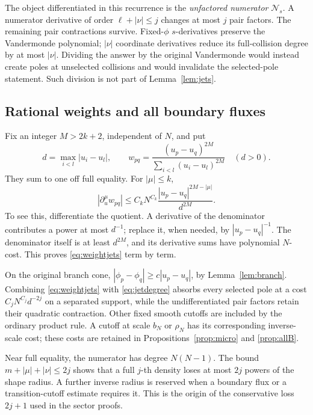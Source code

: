 \documentclass[11pt]{article}
\numberwithin{equation}{section}
\theoremstyle{definition}
\begin{document}
The object differentiated in this recurrence is the
\emph{unfactored numerator} \(\mathscr N_s\).
A numerator derivative of order \(\ell+|\nu|\le j\) changes at
most \(j\) pair factors. The remaining pair contractions survive.
Fixed-\(\phi\) \(s\)-derivatives preserve the Vandermonde polynomial;
\(|\nu|\) coordinate derivatives reduce its full-collision degree
by at most \(|\nu|\).
Dividing the answer by the original Vandermonde would instead
create poles at unselected collisions and would invalidate the
selected-pole statement. Such division is not part of
Lemma~\ref{lem:jets}.

\subsection{Rational weights and all boundary fluxes}
Fix an integer \(M>2k+2\), independent of \(N\), and put
\[
 d=\max_{i<l}|u_i-u_l|,\qquad
 w_{pq}=\frac{(u_p-u_q)^{2M}}
                  {\sum_{i<l}(u_i-u_l)^{2M}}\quad(d>0).
\]
They sum to one off full equality. For \(|\mu|\le k\),
\begin{equation}
 |\partial_u^\mu w_{pq}|
 \le C_kN^{C_k}
       \frac{|u_p-u_q|^{2M-|\mu|}}{d^{2M}}.
 \label{eq:weightjets}
\end{equation}
To see this, differentiate the quotient. A derivative of the
denominator contributes a power at most \(d^{-1}\); replace it,
when needed, by \(|u_p-u_q|^{-1}\). The denominator itself is
at least \(d^{2M}\), and its derivative sums have polynomial
\(N\)-cost. This proves \eqref{eq:weightjets} term by term.

On the original branch cone,
\(|\phi_p-\phi_q|\ge c|u_p-u_q|\), by
Lemma~\ref{lem:branch}. Combining \eqref{eq:weightjets} with
\eqref{eq:jetdegree} absorbs every selected pole at a cost
\(C_jN^{C_j}d^{-2j}\) on a separated support, while the
undifferentiated pair factors retain their quadratic contraction.
Other fixed smooth cutoffs are included by the ordinary product
rule. A cutoff at scale \(b_N\) or \(\rho_N\) has its corresponding
inverse-scale cost; these costs are retained in
Propositions~\ref{prop:micro} and \ref{prop:allB}.

Near full equality, the numerator has degree \(N(N-1)\).
The bound \(m+|\mu|+|\nu|\le2j\) shows that a full \(j\)-th
density loses at most \(2j\) powers of the shape radius.
A further inverse radius is reserved when a boundary flux or
a transition-cutoff estimate requires it. This is the origin
of the conservative loss \(2j+1\) used in the sector proofs.
\end{document}
